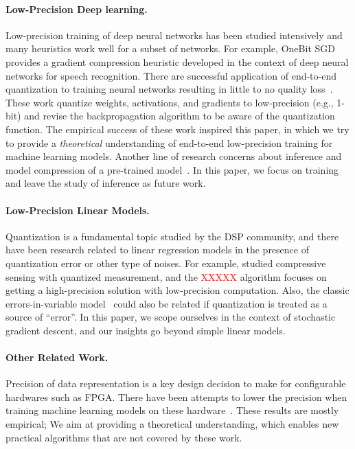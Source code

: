 \documentclass{article}
\begin{document}
\paragraph{Low-Precision Deep learning.}

Low-precision training of deep neural networks has been studied
intensively and many heuristics work well for a subset of networks.
For example, OneBit SGD~\cite{Frank:2014:Interspeech} provides
a gradient compression heuristic developed in the context of deep 
neural networks for speech recognition. There are successful 
application of end-to-end quantization to training neural networks
resulting in little to no quality loss~\cite{hubara2016quantized,
rastegari2016xnor,zhou2016dorefa,miyashita2016convolutional,li2016ternary,gupta2015deep}. These work quantize weights, activations, and gradients 
to low-precision (e.g., 1-bit) and revise the backpropagation 
algorithm to be aware of the quantization function.
The empirical success of these work inspired this paper, in which we try
to provide a {\em theoretical} understanding of end-to-end low-precision
training for machine learning models.
Another line of research concerns about inference and model
compression of a pre-trained model~\cite{vanhoucke2011improving,gong2014compressing,han2015deep,lin2016fixed,kim2016bitwise,kim2015compression,wu2016quantized}.
In this paper, we focus on training and leave the study of
inference as future work.

\vspace{-1em}
\paragraph{Low-Precision Linear Models.}

Quantization is a fundamental topic studied by the
DSP community, and there have been research related to
linear regression models in the presence of quantization
error or other type of noises. For example,
\citet{Gopi:2013:ICML} studied compressive sensing
with quantized measurement, and the \textcolor{red}{XXXXX}
algorithm focuses on getting a high-precision solution
with low-precision computation. Also, the
classic errors-in-variable model~\cite{Hall:2008:Book}
could also be related if quantization is treated 
as a source of ``error''. In this paper, we scope
ourselves in the context of stochastic gradient descent, 
and our insights go beyond simple linear models.

\vspace{-1em}
\paragraph{Other Related Work.} Precision of data
representation is a key design decision to make
for configurable hardwares such as FPGA. There have
been attempts to
lower the precision when training machine learning models
on these hardware~\cite{Kim:2011:ICASSP}. 
These results are mostly empirical; We
aim at providing a theoretical understanding, which 
enables new practical algorithms that are not covered 
by these work.
\end{document}
